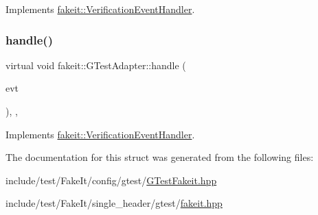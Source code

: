 Implements \mbox{\hyperlink{structfakeit_1_1VerificationEventHandler_adf355a9888bc2bf78ce0e1219bfb1379}{fakeit\+::\+Verification\+Event\+Handler}}.

\mbox{\label{structfakeit_1_1GTestAdapter_af19fbc5b4c9dc6b9c6a8f94eb2b7e322}} 
\subsubsection{\texorpdfstring{handle()}{handle()}\hspace{0.1cm}{\footnotesize\ttfamily [6/6]}}
{\footnotesize\ttfamily virtual void fakeit\+::\+G\+Test\+Adapter\+::handle (\begin{DoxyParamCaption}\item[{const \mbox{\hyperlink{structfakeit_1_1NoMoreInvocationsVerificationEvent}{No\+More\+Invocations\+Verification\+Event}} \&}]{evt }\end{DoxyParamCaption})\hspace{0.3cm}{\ttfamily [inline]}, {\ttfamily [override]}, {\ttfamily [virtual]}}



Implements \mbox{\hyperlink{structfakeit_1_1VerificationEventHandler_a826b9d15e23bad7013b219d8e45ef1d0}{fakeit\+::\+Verification\+Event\+Handler}}.



The documentation for this struct was generated from the following files\+:\begin{DoxyCompactItemize}
\item 
include/test/\+Fake\+It/config/gtest/\mbox{\hyperlink{GTestFakeit_8hpp}{G\+Test\+Fakeit.\+hpp}}\item 
include/test/\+Fake\+It/single\+\_\+header/gtest/\mbox{\hyperlink{single__header_2gtest_2fakeit_8hpp}{fakeit.\+hpp}}\end{DoxyCompactItemize}
